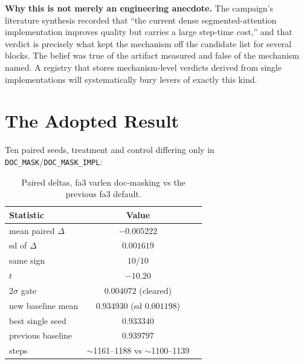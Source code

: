 \documentclass{article}
\begin{document}
\textbf{Why this is not merely an engineering anecdote.} The campaign's literature synthesis recorded that ``the current dense segmented-attention implementation improves quality but carries a large step-time cost,'' and that verdict is precisely what kept the mechanism off the candidate list for several blocks. The belief was true of the artifact measured and false of the mechanism named. A registry that stores mechanism-level verdicts derived from single implementations will systematically bury levers of exactly this kind.

\section{The Adopted Result}
\label{sec:sota}
Ten paired seeds, treatment and control differing only in \texttt{DOC\_MASK}/\texttt{DOC\_MASK\_IMPL}:

\begin{table}[t]
\caption{Paired deltas, fa3 varlen doc-masking vs the previous fa3 default.}
\label{tab:sota}
\vskip 0.1in
\begin{center}\begin{small}\begin{tabular}{lcc}
\toprule
Statistic & Value \\
\midrule
mean paired $\Delta$ & $-0.005222$ \\
sd of $\Delta$ & $0.001619$ \\
same sign & $10/10$ \\
$t$ & $-10.20$ \\
$2\sigma$ gate & $0.004072$ (cleared) \\
new baseline mean & $0.934930$ (sd $0.001198$) \\
best single seed & $0.933340$ \\
previous baseline & $0.939797$ \\
steps & $\sim$1161--1188 vs $\sim$1100--1139 \\
\bottomrule
\end{tabular}\end{small}\end{center}
\vskip -0.15in
\end{table}
\end{document}
